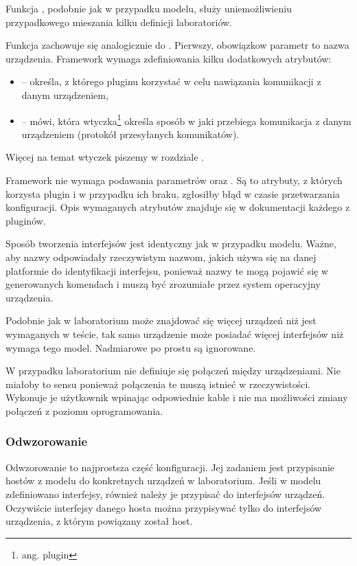 \documentclass[00-praca-magisterska.tex]{subfiles}
\begin{document}
Funkcja , podobnie jak w przypadku modelu, służy
uniemożliwieniu przypadkowego mieszania kilku definicji laboratoriów.

Funkcja  zachowuje się analogicznie do .
Pierwszy, obowiązkow parametr to nazwa urządzenia. Framework wymaga
zdefiniowania kilku dodatkowych atrybutów:
\begin{itemize}
\item {} -- określa, z którego pluginu korzystać w celu
nawiązania komunikacji z danym urządzeniem,
\item {} -- mówi, która wtyczka\footnote{ang. plugin} określa
sposób w jaki przebiega komunikacja z danym urządzeniem (protokół przesyłanych
komunikatów).
\end{itemize}

Więcej na temat wtyczek piszemy w rozdziale .

Framework nie wymaga podawania parametrów  oraz . Są to
atrybuty, z których korzysta plugin  i w przypadku ich braku,
zgłosiłby błąd w czasie przetwarzania konfiguracji. Opis wymaganych atrybutów
znajduje się w dokumentacji każdego z pluginów.

Sposób tworzenia interfejsów jest identyczny jak w przypadku modelu. Ważne, aby
nazwy odpowiadały rzeczywistym nazwom, jakich używa się na danej platformie do
identyfikacji interfejsu, ponieważ nazwy te mogą pojawić się w generowanych
komendach i muszą być zrozumiałe przez system operacyjny urządzenia.

Podobnie jak w laboratorium może znajdować się więcej urządzeń niż jest
wymaganych w teście, tak samo urządzenie może posiadać więcej interfejsów niż
wymaga tego model. Nadmiarowe po prostu są ignorowane.

W przypadku laboratorium nie definiuje się połączeń między urządzeniami. Nie
miałoby to sensu ponieważ połączenia te muszą istnieć w rzeczywistości.
Wykonuje je użytkownik wpinając odpowiednie kable i nie ma możliwości zmiany
połączeń z poziomu oprogramowania.

\subsubsection{Odwzorowanie}

Odwzorowanie to najprostsza część konfiguracji. Jej zadaniem jest przypisanie
hostów z modelu do konkretnych urządzeń w laboratorium. Jeśli w modelu
zdefiniowano interfejsy, również należy je przypisać do interfejsów urządzeń.
Oczywiście interfejsy danego hosta można przypisywać tylko do interfejsów
urządzenia, z którym powiązany został host.
\end{document}
